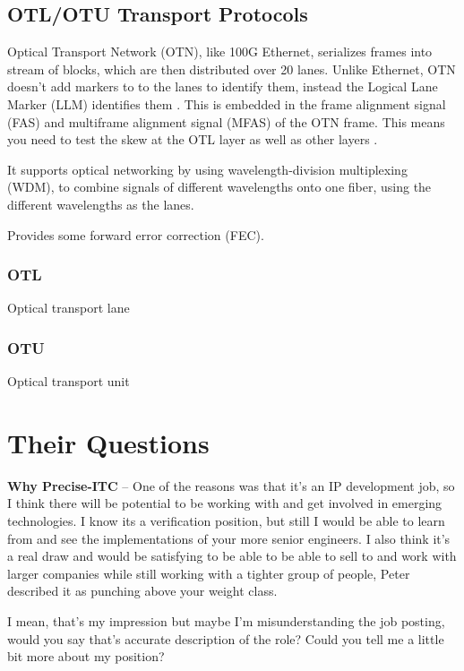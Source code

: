 \documentclass{IEEEtran}
\begin{document}
\subsection{OTL/OTU Transport Protocols}


Optical Transport Network (OTN), like 100G Ethernet, serializes frames into stream of blocks, which are then distributed over 20 lanes. Unlike Ethernet, OTN doesn't add markers to to the lanes to identify them, instead the Logical Lane Marker (LLM) identifies them \cite{otn1}. This is embedded in the frame alignment signal (FAS) and multiframe alignment signal (MFAS) of the OTN frame. This means you need to test the skew at the OTL layer as well as other layers \cite{otn2}.

It supports optical networking by using wavelength-division multiplexing (WDM), to combine signals of different wavelengths onto one fiber, using the different wavelengths as the lanes.

Provides some forward error correction (FEC).

\subsubsection{OTL} Optical transport lane 

\subsubsection{OTU} Optical transport unit

\clearpage

\section{Their Questions}

\textbf{Why Precise-ITC} -- One of the reasons was that it's an IP development job, so I think there will be potential to be working with and get involved in emerging technologies. I know its a verification position, but still I would be able to learn from and see the implementations of your more senior engineers. I also think it's a real draw and would be satisfying to be able to be able to sell to and work with larger companies while still working with a tighter group of people, Peter described it as punching above your weight class. 

I mean, that's my impression but maybe I'm misunderstanding the job posting, would you say that's accurate description of the role? Could you tell me a little bit more about my position?
\end{document}
